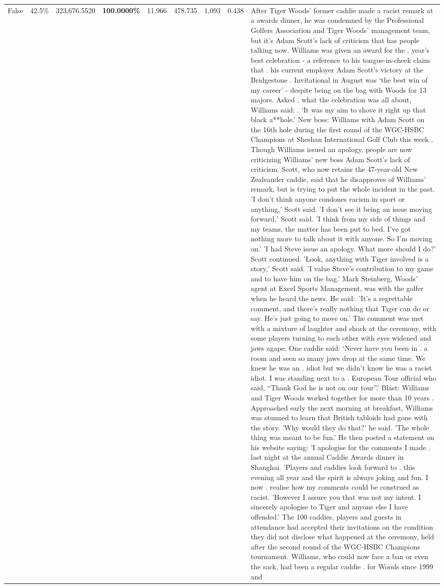 \begin{table}[H]
\begin{tabular}{lllrlllll}
False & 42.5\% & 323,676.5520 & \bfseries \color{red} 100.0000\% & 11.966 & 478.735 & 1,093 & 0.438 & After Tiger Woods' former caddie made a racist remark at a awards dinner, he was condemned by the Professional Golfers Association and Tiger Woods' management team, but it's Adam Scott's lack of criticism that has people talking now. Williams was given an award for the . year’s best celebration - a reference to his tongue-in-cheek claim that . his current employer Adam Scott’s victory at the Bridgestone . Invitational in August was ‘the best win of my career’ - despite being on the bag with Woods for 13 majors. Asked . what the celebration was all about, Williams said: . ‘It was my aim to shove it right up that black a**hole.’ New boss: Williams with Adam Scott  on the 16th hole during the first round of the WGC-HSBC Champions at Sheshan International Golf Club this week . Though Williams issued an apology, people are now criticizing Williams' new boss Adam Scott's lack of criticism. Scott, who now retains the 47-year-old New Zealeander caddie, said that he disapproves of Williams' remark, but is trying to put the whole incident in the past. 'I don't think anyone condones racism in sport or anything,' Scott said. 'I don't see it being an issue moving forward,' Scott said. 'I think from my side of things and my teams, the matter has been put to bed. I've got nothing more to talk about it with anyone. So I'm moving on.' 'I had Steve issue an apology. What more should I do?' Scott continued. 'Look, anything with Tiger involved is a story,' Scott said. 'I value Steve's contribution to my game and to have him on the bag.' Mark Steinberg, Woods' agent at Excel Sports Management, was with the golfer when he heard the news. He said: 'It's a regrettable comment, and there's really nothing that Tiger can do or say. He's just going to move on.' The comment was met with a mixture of laughter and shock at the ceremony, with some players turning to each other with eyes widened and jaws agape. One caddie said: ‘Never have you been in . a room and seen so many jaws drop at the same time. We knew he was an . idiot but we didn’t know he was a racist idiot. I was standing next to a . European Tour official who said, “Thank God he is not on our tour”.’ Blast: Williams and Tiger Woods worked together for more than 10 years . Approached early the next morning at breakfast, Williams was stunned to learn that British tabloids had gone with the story. 'Why would they do that?' he said. 'The whole thing was meant to be fun.' He then posted a statement on his website saying: 'I apologise for the comments I made . last night at the annual Caddie Awards dinner in Shanghai. 'Players and caddies look forward to . this evening all year and the spirit is always joking and fun. I now . realise how my comments could be construed as racist. 'However I assure you that was not my intent. I sincerely apologise to Tiger and anyone else I have offended.' The 100 caddies, players and guests in attendance had accepted their invitations on the condition they did not disclose what happened at the ceremony, held after the second round of the WGC-HSBC Champions tournament. Williams, who could now face a ban or even the sack, had been a regular caddie . for Woods since 1999 and 
\end{tabular}
\end{table}
